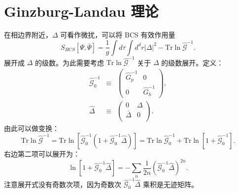 \documentclass[10pt,UTF8]{ctexart}
\begin{document}
\section*{Ginzburg-Landau 理论}
\noindent 在相边界附近，$\Delta$ 可看作微扰，可以将 BCS 有效作用量
\begin{equation}
	S_{BCS}[\Psi,\bar\Psi] = \frac{1}{g} \int d\tau \int d^d r |\Delta|^2- \mathrm{Tr} \ln \hat{\mathcal G}^{-1}.
\end{equation}
展开成 $\Delta$ 的级数。为此需要考虑 $\mathrm{Tr} \ln \hat{\mathcal G}^{-1}$ 关于 $\Delta$ 的级数展开。定义：
\begin{eqnarray}
	\hat{\mathcal G}_0^{-1} &\equiv & \left( 
	\begin{array}{cc}
		\hat G_p^{-1} & 0\\
		0 & \hat G_h^{-1}
	\end{array}
	\right), \nonumber \\
	\hat \Delta &\equiv & \left( 
	\begin{array}{cc}
		0 & \Delta \\
		\bar\Delta & 0 \\
	\end{array}
	\right).
\end{eqnarray}
由此可以做变换：
\begin{equation}
	\mathrm{Tr} \ln \hat{\mathcal G}^{-1} 
	= \mathrm{Tr} \ln \left[ \hat{\mathcal G}^{-1}_0(1+\hat{\mathcal G}^{-1}_0 \hat \Delta) \right]
	= \mathrm{Tr} \ln \hat{\mathcal G}^{-1}_0 + \mathrm{Tr}\ln[1+\hat{\mathcal G}^{-1}_0].
\end{equation}
右边第二项可以展开为：
\begin{equation}
	\ln[1+\hat{\mathcal G}^{-1}_0 \hat \Delta]= -\sum_n \frac{1}{2n}(\hat{\mathcal G}^{-1}_0 \hat\Delta)^{2n}.
\end{equation}
注意展开式没有奇数次项，因为奇数次 $\hat{\mathcal G}^{-1}_0 \hat\Delta$ 乘积是无迹矩阵。
\end{document}
